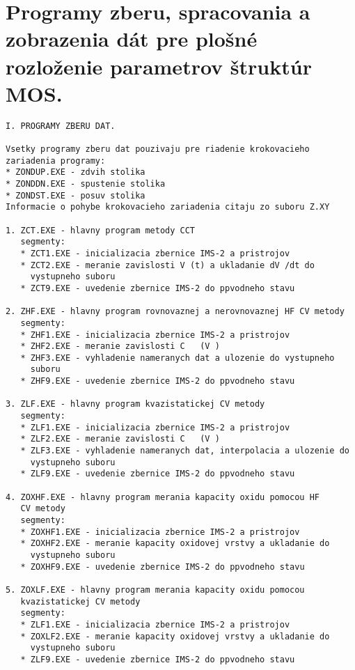 
\chapter{Programy zberu, spracovania a zobrazenia dát pre plošné rozloženie parametrov štruktúr MOS.} %

\label{app:AppendixH} %


\begin{verbatim}
I. PROGRAMY ZBERU DAT.

Vsetky programy zberu dat pouzivaju pre riadenie krokovacieho zariadenia programy:
* ZONDUP.EXE - zdvih stolika
* ZONDDN.EXE - spustenie stolika
* ZONDST.EXE - posuv stolika
Informacie o pohybe krokovacieho zariadenia citaju zo suboru Z.XY

1. ZCT.EXE - hlavny program metody CCT
   segmenty:
   * ZCT1.EXE - inicializacia zbernice IMS-2 a pristrojov
   * ZCT2.EXE - meranie zavislosti V (t) a ukladanie dV /dt do
     vystupneho suboru
   * ZCT9.EXE - uvedenie zbernice IMS-2 do ppvodneho stavu

2. ZHF.EXE - hlavny program rovnovaznej a nerovnovaznej HF CV metody
   segmenty:
   * ZHF1.EXE - inicializacia zbernice IMS-2 a pristrojov
   * ZHF2.EXE - meranie zavislosti C   (V )
   * ZHF3.EXE - vyhladenie nameranych dat a ulozenie do vystupneho
     suboru
   * ZHF9.EXE - uvedenie zbernice IMS-2 do ppvodneho stavu

3. ZLF.EXE - hlavny program kvazistatickej CV metody
   segmenty:
   * ZLF1.EXE - inicializacia zbernice IMS-2 a pristrojov
   * ZLF2.EXE - meranie zavislosti C   (V )
   * ZLF3.EXE - vyhladenie nameranych dat, interpolacia a ulozenie do
     vystupneho suboru
   * ZLF9.EXE - uvedenie zbernice IMS-2 do ppvodneho stavu

4. ZOXHF.EXE - hlavny program merania kapacity oxidu pomocou HF
   CV metody
   segmenty:
   * ZOXHF1.EXE - inicializacia zbernice IMS-2 a pristrojov
   * ZOXHF2.EXE - meranie kapacity oxidovej vrstvy a ukladanie do
     vystupneho suboru
   * ZOXHF9.EXE - uvedenie zbernice IMS-2 do ppvodneho stavu

5. ZOXLF.EXE - hlavny program merania kapacity oxidu pomocou
   kvazistatickej CV metody
   segmenty:
   * ZLF1.EXE - inicializacia zbernice IMS-2 a pristrojov
   * ZOXLF2.EXE - meranie kapacity oxidovej vrstvy a ukladanie do
     vystupneho suboru
   * ZLF9.EXE - uvedenie zbernice IMS-2 do ppvodneho stavu



\end{verbatim}

